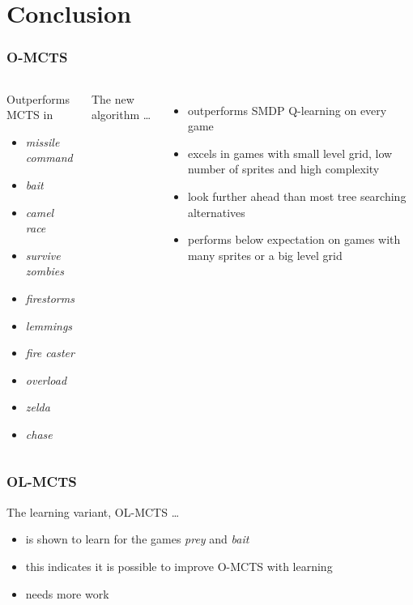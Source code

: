 \documentclass[aspectratio=169]{beamer}
\begin{document}
\section{Conclusion}
\begin{frame}
	\frametitle{O-MCTS}
	\begin{columns}
		\begin{block}{Outperforms MCTS in}
			\begin{itemize}
				\item \textit{missile command}
				\item \textit{bait}
				\item \textit{camel race}
				\item \textit{survive zombies}
				\item \textit{firestorms}
				\item \textit{lemmings}
				\item \textit{fire caster}
				\item \textit{overload}
				\item \textit{zelda}
				\item \textit{chase}
			\end{itemize}
		\end{block}
		The new algorithm \ldots
			\begin{itemize}
				\item outperforms SMDP Q-learning on every game 
				\item excels in games with small level grid, low number of
					sprites and high complexity
				\item look further ahead than most tree searching alternatives
				\item performs below expectation on games with many sprites or a
					big level grid
			\end{itemize}
	\end{columns}
\end{frame}

\begin{frame}
	\frametitle{OL-MCTS}
	The learning variant, OL-MCTS \ldots
	\begin{itemize}
		\item is shown to learn for the games \textit{prey} and \textit{bait}
		\item this indicates it is possible to improve O-MCTS with learning
		\item needs more work
	\end{itemize}
\end{frame}
\end{document}
